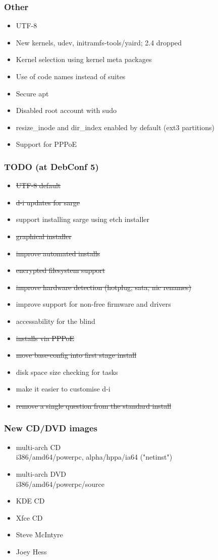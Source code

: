 \documentclass{beamer}
\begin{document}
\begin{frame}
  \frametitle{Other}
	\begin{itemize}
	\item
		UTF-8
	\item
		New kernels, udev, initramfs-tools/yaird; 2.4 dropped
	\item
		Kernel selection using kernel meta packages
	\item
		Use of code names instead of suites
	\item
		Secure apt
	\item
		Disabled root account with sudo
	\item
		resize\_inode and dir\_index enabled by default (ext3 partitions)
	\item
		Support for PPPoE
	\end{itemize}
\end{frame}

\begin{frame}
  \frametitle{TODO (at DebConf 5)}
  	\begin{itemize}
	\item \st{UTF-8 default}
	\item \st{d-i updates for sarge}
	\item support installing sarge using etch installer
	\item \st{graphical installer}
	\item \st{improve automated installs}
	\item \st{encrypted filesystem support}
	\item \st{improve hardware detection (hotplug, sata, nic renames)}
	\item improve support for non-free firmware and drivers
	\item accessability for the blind
	\item \st{installs via PPPoE}
	\item \st{move base-config into first stage install}
	\item disk space size checking for tasks
	\item make it easier to customise d-i
	\item \st{remove a single question from the standard install}
	\end{itemize}
\end{frame}

\begin{frame}
  \frametitle{New CD/DVD images}
	\begin{itemize}
	\item
		multi-arch CD \\
		i386/amd64/powerpc, alpha/hppa/ia64 ("netinst")
	\item
		multi-arch DVD \\
		i386/amd64/powerpc/source
	\item
		KDE CD
	\item
		Xfce CD
	\end{itemize}
	\begin{itemize}
	\item
		Steve McIntyre
	\item
		Joey Hess
	\end{itemize}
\end{frame}
\end{document}
